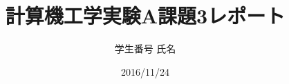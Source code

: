 \documentclass[a4paper]{jarticle}
\title{計算機工学実験A課題3レポート}
\author{学生番号 氏名}
\date{2016/11/24}
\begin{document}
\maketitle

\begin{comment}
\section{実験の総括的な目的}
ハードウェア記述言語のSystem Verilogを使って回路を設計し、テストベンチを使ってModelSim上で回路の動作を確かめる。
\section{実験結果}
\subsection{課題1}
\subsubsection{目的}
配布された「速攻ModelSim」に記載された手順に従って、workフォルダの中にあるsyllyfunction.svの中のsillyfunctionの動作を、三種類のテストベッド$(testbench\_example1.sv,testbench\_example2.sv,testbench\_example3.sv)$を使ってModelSim上で試す。

\end{comment}
\end{document}
